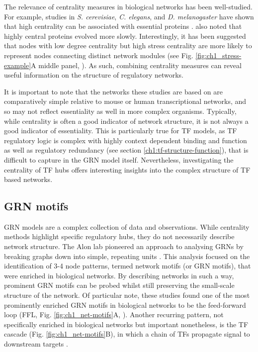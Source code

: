 The relevance of centrality measures in biological networks has been well-studied. For example, studies in \textit{S. cerevisiae}, \textit{C. elegans}, and \textit{D. melanogaster} have shown that high centrality can be associated with essential proteins \citep{hahn_comparative_2005, jeong_lethality_2001, koschutzki_centrality_2008}. \cite{hahn_comparative_2005} also noted that highly central proteins evolved more slowly. Interestingly, it has been suggested that nodes with low degree centrality but high stress centrality are more likely to represent nodes connecting distinct network modules (see Fig. \ref{fig:ch1_stress-example}A middle panel, \cite{joy_high-betweenness_2005, koschutzki_centrality_2008}). As such, combining centrality measures can reveal useful information on the structure of regulatory networks.

It is important to note that the networks these studies are based on are comparatively simple relative to mouse or human transcriptional networks, and so may not reflect essentiality as well in more complex organisms. Typically, while centrality is often a good indicator of network structure, it is not always a good indicator of essentiality. This is particularly true for TF models, as TF regulatory logic is complex with highly context dependent binding and function as well as regulatory redundancy (see section \ref{ch1:tf-structure-function}), that is difficult to capture in the GRN model itself. Nevertheless, investigating the centrality of TF hubs offers interesting insights into the complex structure of TF based networks.

\subsection{\label{ch1:grn-motifs}GRN motifs}

GRN models are a complex collection of data and observations. While centrality methods highlight specific regulatory hubs, they do not necessarily describe network structure. The Alon lab pioneered an approach to analysing GRNs by breaking graphs down into simple, repeating units \citep{shen-orr_network_2002, milo_network_2002, mangan_structure_2003}. This analysis focused on the identification of 3-4 node patterns, termed network motifs (or GRN motifs), that were enriched in biological networks. By describing networks in such a way, prominent GRN motifs can be probed whilst still preserving the small-scale structure of the network. Of particular note, these studies found one of the most prominently enriched GRN motifs in biological networks to be the feed-forward loop (FFL, Fig. \ref{fig:ch1_net-motifs}A, \cite{milo_network_2002, mangan_structure_2003}). Another recurring pattern, not specifically enriched in biological networks but important nonetheless, is the TF cascade (Fig. \ref{fig:ch1_net-motifs}B), in which a chain of TFs propagate signal to downstream targets \citep{lee_transcriptional_2002, rosenfeld_response_2003}. 

